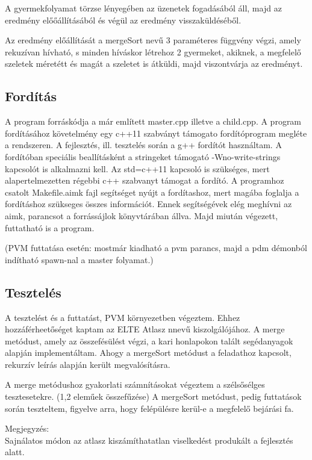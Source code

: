\documentclass[a4paper,12pt]{amsart}%
\begin{document}
A gyermekfolyamat törzse lényegében az üzenetek fogadásából áll, majd az eredmény előőállításából és végül az eredmény visszaküldéséből.

Az eredmény előállítását a mergeSort nevű 3 paraméteres függvény végzi, amely rekuzívan hívható, s minden híváskor létrehoz 2 gyermeket, akiknek, a megfelelő szeletek méretétt és magát a szeletet is átküldi, majd viszontvárja az eredményt.

\subsection{Fordítás}
A program forráskódja a már említett master.cpp illetve a child.cpp. A program fordításához követelmény egy c++11
szabványt támogato fordítóprogram megléte a rendszeren.
A fejlesztés, ill. tesztelés során a g++ fordítót használtam. A fordítóban speciális beallításként a
stringeket támogató -Wno-write-strings kapcsolót is alkalmazni kell.
Az std=c++11 kapcsoló is szükséges, mert alapertelmezetten régebbi c++ szabvanyt támogat a fordító.
A programhoz csatolt Makefile.aimk fajl segítséget nyújt a fordítashoz, mert magába foglalja a fordításhoz szükseges összes információt.
Ennek segítségévek elég meghívni az aimk, parancsot a forrássájlok könyvtárában állva. Majd miután végezett, futtatható is a program.

(PVM futtatása esetén: mostmár kiadható a pvm parancs, majd a pdm démonból indítható spawn-nal a master folyamat.)

\subsection{Tesztelés}	

A tesztelést és a futtatást, PVM környezetben végeztem.
Ehhez hozzáférheetőséget kaptam az ELTE Atlasz nnevű kiszolgálójához.
A merge metódust, amely az összefésülést végzi, a kari honlapokon talált segédanyagok alapján implementáltam.
Ahogy a mergeSort metódust a feladathoz kapcsolt, rekurzív leírás alapján került megvalósításra.

A merge metódushoz gyakorlati számnításokat végeztem a szélsősélges tesztesetekre. (1,2 eleműek összefűzése)
A mergeSort metódust, pedig futtatások során teszteltem, figyelve arra, hogy felépülésre kerül-e a megfelelő bejárási fa.

Megjegyzés:\\
Sajnálatos módon az atlasz kiszámíthatatlan viselkedést produkált a fejlesztés alatt.

\printbibliography
\end{document}
